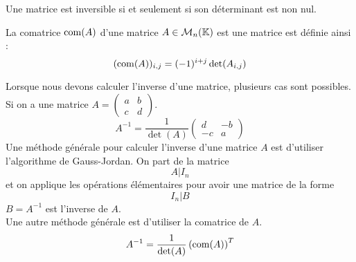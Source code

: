 \begin{proposition}
	Une matrice est inversible si et seulement si son déterminant est non nul.
\end{proposition}

\begin{definition}[Comatrice]
	La comatrice $\operatorname{com}(A)$ d'une matrice $A \in \mathcal{M}_n(\mathbb{K})$ est une matrice est définie ainsi :
	\[ (\operatorname{com}(A))_{i,j} = (-1)^{i+j} \det(A_{i,j}) \]
\end{definition}

Lorsque nous devons calculer l'inverse d'une matrice, plusieurs cas sont possibles.
    Si on a une matrice
    $A =
    \begin{pmatrix}
        a & b \\
        c & d
    \end{pmatrix}
    $.
    \[
    A^{-1} = \frac{1}{\det(A)} 
    \begin{pmatrix}
        d & -b \\
        -c & a
    \end{pmatrix}
    \]
    Une méthode générale pour calculer l'inverse d'une matrice $A$ est d'utiliser l'algorithme de Gauss-Jordan.
    On part de la matrice 
    \[ A|I_n \]
    et on applique les opérations élémentaires pour avoir une matrice de la forme
    \[I_n|B\]
    $B = A^{-1}$ est l'inverse de $A$.
    \\
    Une autre méthode générale est d'utiliser la comatrice de $A$.
    \[ A^{-1} = \frac{1}{\det(A)} \left( \operatorname{com}(A) \right)^T \]


